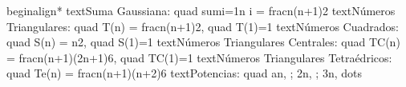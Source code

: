 {}\markdownRendererBackslash{}begin\markdownRendererLeftBrace{}align*\markdownRendererRightBrace{}\markdownRendererSoftLineBreak
{}\markdownRendererBackslash{}text\markdownRendererLeftBrace{}Suma Gaussiana:\markdownRendererRightBrace{} \markdownRendererAmpersand{} \markdownRendererBackslash{}quad \markdownRendererBackslash{}sum\markdownRendererUnderscore{}\markdownRendererLeftBrace{}i=1\markdownRendererRightBrace{}\markdownRendererCircumflex{}\markdownRendererLeftBrace{}n\markdownRendererRightBrace{} i = \markdownRendererBackslash{}frac\markdownRendererLeftBrace{}n(n+1)\markdownRendererRightBrace{}\markdownRendererLeftBrace{}2\markdownRendererRightBrace{} \markdownRendererBackslash{}\markdownRendererBackslash{}\markdownRendererSoftLineBreak
{}\markdownRendererBackslash{}text\markdownRendererLeftBrace{}Números Triangulares:\markdownRendererRightBrace{} \markdownRendererAmpersand{} \markdownRendererBackslash{}quad T(n) = \markdownRendererBackslash{}frac\markdownRendererLeftBrace{}n(n+1)\markdownRendererRightBrace{}\markdownRendererLeftBrace{}2\markdownRendererRightBrace{}, \markdownRendererBackslash{}quad T(1)=1 \markdownRendererBackslash{}\markdownRendererBackslash{}\markdownRendererSoftLineBreak
{}\markdownRendererBackslash{}text\markdownRendererLeftBrace{}Números Cuadrados:\markdownRendererRightBrace{} \markdownRendererAmpersand{} \markdownRendererBackslash{}quad S(n) = n\markdownRendererCircumflex{}2, \markdownRendererBackslash{}quad S(1)=1 \markdownRendererBackslash{}\markdownRendererBackslash{}\markdownRendererSoftLineBreak
{}\markdownRendererBackslash{}text\markdownRendererLeftBrace{}Números Triangulares Centrales:\markdownRendererRightBrace{} \markdownRendererAmpersand{} \markdownRendererBackslash{}quad TC(n) = \markdownRendererBackslash{}frac\markdownRendererLeftBrace{}n(n+1)(2n+1)\markdownRendererRightBrace{}\markdownRendererLeftBrace{}6\markdownRendererRightBrace{}, \markdownRendererBackslash{}quad TC(1)=1 \markdownRendererBackslash{}\markdownRendererBackslash{}\markdownRendererSoftLineBreak
{}\markdownRendererBackslash{}text\markdownRendererLeftBrace{}Números Triangulares Tetraédricos:\markdownRendererRightBrace{} \markdownRendererAmpersand{} \markdownRendererBackslash{}quad Te(n) = \markdownRendererBackslash{}frac\markdownRendererLeftBrace{}n(n+1)(n+2)\markdownRendererRightBrace{}\markdownRendererLeftBrace{}6\markdownRendererRightBrace{} \markdownRendererBackslash{}\markdownRendererBackslash{}\markdownRendererSoftLineBreak
{}\markdownRendererBackslash{}text\markdownRendererLeftBrace{}Potencias:\markdownRendererRightBrace{} \markdownRendererAmpersand{} \markdownRendererBackslash{}quad a\markdownRendererCircumflex{}n, ; 2\markdownRendererCircumflex{}n, ; 3\markdownRendererCircumflex{}n, \markdownRendererBackslash{}dots \markdownRendererBackslash{}\markdownRendererBackslash{}\markdownRendererSoftLineBreak
